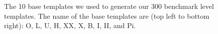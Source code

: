 \documentclass[runningheads]{llncs}
\begin{document}
\renewcommand{\sokoimg}[1]{\texttt{[image: \#1]} \hspace{-0.35em}}
\begin{figure}
\centering
\e\n
\w\w\w\w\w\w\w\e \w\w\w\w\w\e\e\e\e\e\e \w\w\w\w\w\e\e\w\w\w\w\w\n
\w\g\g\e\g\g\w\e \w\g\g\g\w\e\e\e\e\e\e \w\g\g\g\w\e\e\w\g\g\g\w\n
\w\e\e\g\e\e\w\e \w\g\e\g\w\e\e\e\e\e\e \w\g\e\g\w\e\e\w\g\e\g\w\n
\w\e\e\g\e\e\w\e \w\e\e\e\w\w\w\w\w\w\e \w\e\e\e\w\w\w\w\e\e\e\w\n
\w\g\g\e\g\g\w\e \w\g\e\e\e\e\e\e\g\w\e \w\g\e\e\e\e\e\e\e\e\g\w\n
\w\w\w\w\w\w\w\e \w\g\g\e\e\g\g\g\g\w\e \w\g\g\e\e\g\g\g\g\g\g\w\n
\e\e\e\e\e\e\e\e \w\w\w\w\w\w\w\w\w\w\e \w\w\w\w\w\w\w\w\w\w\w\w\n
\e\n
\w\w\w\w\w\e\e\w\w\w\w\w\e \e\e\e\w\w\w\w\e\w\w\w\w\e\e\e\n
\w\g\g\g\w\e\e\w\g\g\g\w\e \e\e\e\w\g\g\w\e\w\g\g\w\e\e\e\n
\w\e\e\e\w\w\w\w\e\e\e\w\e \w\w\w\w\e\e\w\w\w\e\e\w\w\w\w\n
\w\e\e\e\e\g\g\e\e\e\e\w\e \w\g\e\e\e\e\e\e\e\e\e\e\e\g\w\n
\w\e\e\e\w\w\w\w\e\e\e\w\e \w\g\e\e\e\e\e\e\e\e\e\e\e\g\w\n
\w\g\g\g\w\e\e\w\g\g\g\w\e \w\w\w\w\e\e\w\w\w\e\e\w\w\w\w\n
\w\w\w\w\w\e\e\w\w\w\w\w\e \e\e\e\w\g\g\w\e\w\g\g\w\e\e\e\n
\e\e\e\e\e\e\e\e\e\e\e\e\e \e\e\e\w\w\w\w\e\w\w\w\w\e\e\e\n
\e\n
\e\e\e\w\w\w\w\w\e\e\e\e \w\w\w\w\w\e\e\e\e \w\w\w\w\w\w\w\w\w\w\n
\e\e\e\w\g\g\g\w\e\e\e\e \w\g\g\g\w\e\e\e\e \w\g\g\g\e\e\e\g\g\w\n
\w\w\w\w\e\e\e\w\w\w\w\e \w\g\e\g\w\e\e\e\e \w\g\e\e\e\e\e\e\g\w\n
\w\g\e\e\e\w\e\e\e\g\w\e \w\e\w\e\w\w\w\w\e \w\w\w\w\e\e\w\w\w\w\n
\w\g\e\e\e\w\e\e\e\g\w\e \w\e\w\e\e\e\g\w\e \e\e\e\w\g\g\w\e\e\e\n
\w\w\w\w\e\e\e\w\w\w\w\e \w\g\g\e\e\g\g\w\e \w\w\w\w\e\e\w\w\w\w\n
\e\e\e\w\g\g\g\w\e\e\e\e \w\w\w\w\w\w\w\w\e \w\g\e\e\e\e\e\e\g\w\n
\e\e\e\w\w\w\w\w\e\e\e\e \e\e\e\e\e\e\e\e\e \w\g\g\g\e\e\e\g\g\w\n
\e\e\e\e\e\e\e\e\e\e\e\e \e\e\e\e\e\e\e\e\e \w\w\w\w\w\w\w\w\w\w\n
\e\n
\w\w\w\w\w\w\w\w\w\w\w\w\w\e \w\w\w\w\w\w\w\w\w\w\w\w\w\w\n
\w\g\g\g\e\g\g\g\e\e\g\g\w\e \w\g\g\g\e\e\g\g\e\e\g\g\g\w\n
\w\g\e\e\e\e\e\e\e\e\e\g\w\e \w\g\e\e\e\e\e\e\e\e\e\e\g\w\n
\w\w\w\w\e\w\w\w\e\w\w\w\w\e \w\w\w\w\e\e\w\w\e\e\w\w\w\w\n
\e\e\e\w\e\w\e\w\e\w\e\e\e\e \e\e\e\w\e\e\w\w\e\e\w\e\e\e\n
\w\w\w\w\e\w\w\w\e\w\w\w\w\e \w\w\w\w\e\e\w\w\e\e\w\w\w\w\n
\w\g\e\e\e\e\e\e\e\e\e\g\w\e \w\g\e\e\e\e\w\w\e\e\e\e\g\w\n
\w\g\g\g\e\g\g\g\e\e\g\g\w\e \w\g\g\g\g\g\w\w\g\g\g\g\g\w\n
\w\w\w\w\w\w\w\w\w\w\w\w\w\e \w\w\w\w\w\w\w\w\w\w\w\w\w\w\n
\caption{The 10 base templates we used to generate our 300 benchmark level templates. The
name of the base templates are (top left to bottom right): O, L, U, H, XX, X, B, I, II, and Pi.}
\label{fig-meta-templates}
\end{figure}
\end{document}
